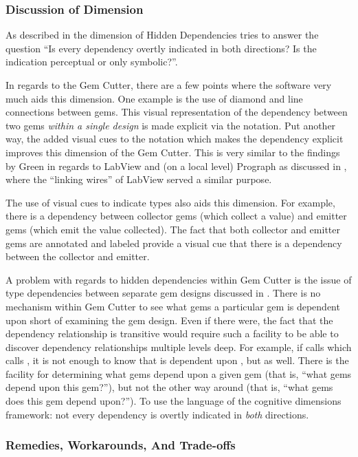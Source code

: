 \subsubsection{Discussion of Dimension}

As described in  the dimension of Hidden Dependencies tries to answer the question ``Is every dependency overtly indicated in both directions? Is the indication perceptual or only symbolic?''.

In regards to the Gem Cutter, there are a few points where the software very much aids this dimension.  One example is the use of diamond and line connections between gems.  This visual representation of the dependency between two gems \emph{within a single design} is made explicit via the notation.  Put another way, the added visual cues to the notation which makes the dependency explicit improves this dimension of the Gem Cutter.  This is very similar to the findings by Green in regards to LabView and (on a local level) Prograph as discussed in , where the ``linking wires'' of LabView served a similar purpose.

The use of visual cues to indicate types also aids this dimension.  For example, there is a dependency between collector gems (which collect a value) and emitter gems (which emit the value collected).  The fact that both collector and emitter gems are annotated and labeled provide a visual cue that there is a dependency between the collector and emitter.

A problem with regards to hidden dependencies within Gem Cutter is the issue of type dependencies between separate gem designs discussed in .  There is no mechanism within Gem Cutter to see what gems a particular gem is dependent upon short of examining the gem design.  Even if there were, the fact that the dependency relationship is transitive would require such a facility to be able to discover dependency relationships multiple levels deep.  For example, if  calls  which calls , it is not enough to know that  is dependent upon , but  as well.  There is the facility for determining what gems depend upon a given gem (that is, ``what gems depend upon this gem?''), but not the other way around (that is, ``what gems does this gem depend upon?'').  To use the language of the cognitive dimensions framework: not every dependency is overtly indicated in \emph{both} directions.

\subsubsection{Remedies, Workarounds, And Trade-offs}

